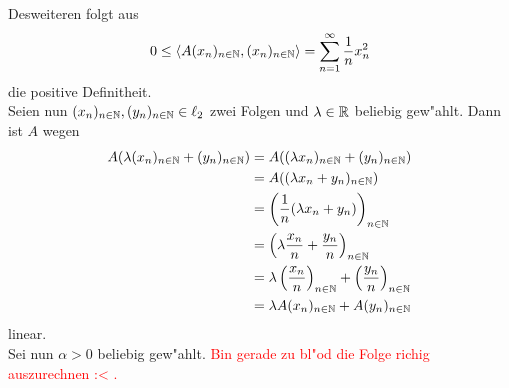\begin{itemize}
Desweiteren folgt aus
\[
0 \le \langle A(x_n)_{n\in\mathbb{N}}, (x_n)_{n\in\mathbb{N}} \rangle = \sum_{n=1}^\infty \frac{1}{n}x_n^2
\]
die positive Definitheit. \\

Seien nun $(x_n)_{n\in\mathbb{N}}, (y_n)_{n\in\mathbb{N}}\in\ell_2$ zwei Folgen und $\lambda\in\mathbb{R}$ beliebig gew"ahlt.
Dann ist $A$ wegen
\begin{align*}
A(\lambda(x_n)_{n\in\mathbb{N}}+(y_n)_{n\in\mathbb{N}}) &= A((\lambda x_n)_{n\in\mathbb{N}} + (y_n)_{n\in\mathbb{N}})\\
&= A((\lambda x_n + y_n)_{n\in\mathbb{N}})\\
&= \left(\frac{1}{n} (\lambda x_n + y_n) \right)_{n\in\mathbb{N}}\\
&= \left( \lambda\frac{x_n}{n} + \frac{y_n}{n}\right)_{n\in\mathbb{N}}\\
&= \lambda\left(\frac{x_n}{n}\right)_{n\in\mathbb{N}} + \left(\frac{y_n}{n}\right)_{n\in\mathbb{N}}\\
&= \lambda A(x_n)_{n\in\mathbb{N}} + A(y_n)_{n\in\mathbb{N}}
\end{align*}
linear.\\

Sei nun $\alpha > 0$ beliebig gew"ahlt. \textcolor{red}{Bin gerade zu bl"od
die Folge richig auszurechnen :< .}

\end{itemize}
